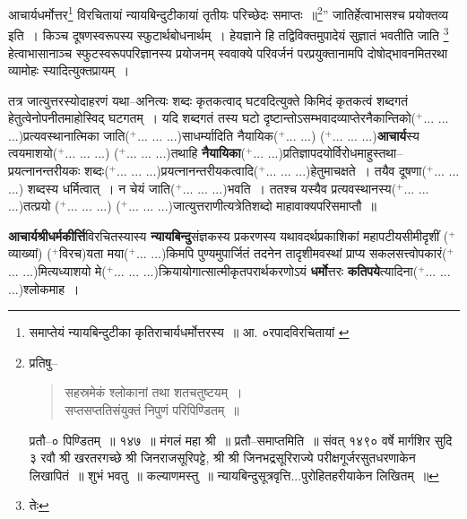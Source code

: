 \documentclass[article,12pt,a4paper]{memoir}
\newcommand{\add}[1]{($^{+}$#1)}
\begin{document}
	आचार्यधर्मोत्तर\footnote{समाप्तेयं न्यायबिन्दुटीका कृतिराचार्यधर्मोत्तरस्य ॥ आ. ०रपादविरचितायां \cite{dp-msB} \cite{dp-msD}} विरचितायां न्यायबिन्दुटीकायां तृतीयः परिच्छेदः समाप्तः ॥\footnote{\cite{dp-msA} \cite{dp-msB} प्रतिषु--
	    \begin{verse}
	सहस्रमेकं श्लोकानां तथा शतचतुष्टयम् ।\\
	    सप्तसप्ततिसंयुक्तं निपुणं परिपिण्डितम् ॥\\
	    
	    \end{verse}
	   \cite{dp-msD} प्रतौ--० पिण्डितम् ॥ १४७ ॥ मंगलं महा श्री ॥ \cite{dp-msC} प्रतौ--समाप्तमिति ॥ संवत् १४९० वर्षे मार्गशिर सुदि ३ रवौ श्री खरतरगच्छे श्री जिनराजसूरिपट्टे, श्री श्री जिनभद्रसूरिराज्ये परीक्षगूर्जरसुतधरणाकेन लिखापितं ॥ शुभं भवतु ॥ कल्याणमस्तु ॥ न्यायबिन्दुसूत्रवृत्ति...पुरोहितहरीयाकेन लिखितम् ॥}” जातिर्हेत्वाभासश्च प्रयोक्तव्य इति । किञ्च दूषणस्वरूपस्य स्फुटार्थबोधनार्थम् । हेयज्ञाने हि तद्विविक्तमुपादेयं सुज्ञातं भवतीति जाति \footnote{तेः} हेत्वाभासानाञ्च स्फुटस्वरूपपरिज्ञानस्य प्रयोजनम् स्ववाक्ये परिवर्जनं परप्रयुक्तानामपि दोषोद्भावनमितरथा व्यामोहः स्यादित्युक्तप्रायम् ।
	\pend
      

	  \pstart तत्र जात्युत्तरस्योदाहरणं यथा--अनित्यः शब्दः कृतकत्वाद् घटवदित्युक्ते किमिदं कृतकत्वं शब्दगतं हेतुत्वेनोपनीतमाहोस्विद् घटगतम् । यदि शब्दगतं तस्य घटो दृष्टान्तोऽसम्भवादव्याप्तेरनैकान्तिको\add{... ... ...}प्रत्यवस्थानात्मिका जाति\add{... ... ...}साधर्म्यादिति नैयायिक\add{... ...} \add{... ... ...}\textbf{आचार्य}स्य त्वयमाशयो\add{... ... ...} \add{... ... ...}तथाहि \textbf{नैयायिका}\add{... ...}प्रतिज्ञापदयोर्विरोधमाहुस्तथा--प्रयत्नानन्तरीयकः शब्दः\add{... ... ...}प्रयत्नानन्तरीयकत्वादि\add{... ... ...}हेतुमाचक्षते । तयैव दूषणा\add{... ... ...} शब्दस्य धर्मित्वात् । न चेयं जाति\add{... ... ...}भवति । ततश्च यस्यैव प्रत्यवस्थानस्य\add{... ... ...}तत्प्रयो \add{... ... ...} \add{... ... ...}जात्युत्तराणीत्यत्रेतिशब्दो माहावाक्यपरिसमाप्तौ ॥
	\pend
      \leavevmode{}

	  \pstart \textbf{आचार्यश्रीधर्मकीर्त्ति}विरचितस्यास्य \textbf{न्यायबिन्दु}संज्ञकस्य प्रकरणस्य यथावदर्थप्रकाशिकां महापटीयसीमीदृशीं \add{व्याख्यां} \add{विरच}यता मया\add{... ...}किमपि पुण्यमुपार्जितं तदनेन तादृशीमवस्थां प्राप्य सकलसत्त्वोपकारं\add{... ...}मित्यध्याशयो मे\add{... ... ...}क्रियायोगात्सात्मीकृतपरार्थकरणोऽयं \textbf{धर्मो}त्तरः \textbf{कतिपये}त्यादिना\add{... ... ...}श्लोकमाह ।
	\pend
      
\end{document}
